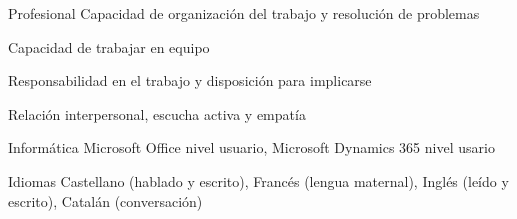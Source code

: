 

\begin{cvskills}

  \cvskill
    {Profesional} %
    {Capacidad de organización del trabajo y resolución de problemas} %

  \cvskill
    {} %
    {Capacidad de trabajar en equipo} %

  \cvskill
    {} %
    {Responsabilidad en el trabajo y disposición para implicarse} %

  \cvskill
    {} %
    {Relación interpersonal, escucha activa y empatía} %

  \cvskill
    {Informática} %
    {Microsoft Office nivel usuario, Microsoft Dynamics 365 nivel usario} %

  \cvskill
    {Idiomas} %
    {Castellano (hablado y escrito), Francés (lengua maternal), Inglés (leído y escrito), Catalán (conversación)} %

\end{cvskills}
